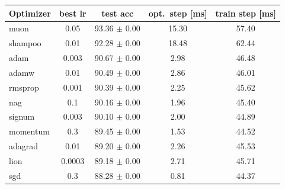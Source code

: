 \begin{tabular}{lcccc}
\toprule
Optimizer & best lr & test acc & opt.\ step [ms] & train step [ms] \\
\midrule
muon & 0.05 & 93.36 $\pm$ 0.00 & 15.30 & 57.40 \\
shampoo & 0.01 & 92.28 $\pm$ 0.00 & 18.48 & 62.44 \\
adam & 0.003 & 90.67 $\pm$ 0.00 & 2.98 & 46.48 \\
adamw & 0.01 & 90.49 $\pm$ 0.00 & 2.86 & 46.01 \\
rmsprop & 0.001 & 90.39 $\pm$ 0.00 & 2.25 & 45.62 \\
nag & 0.1 & 90.16 $\pm$ 0.00 & 1.96 & 45.40 \\
signum & 0.003 & 90.10 $\pm$ 0.00 & 2.00 & 44.89 \\
momentum & 0.3 & 89.45 $\pm$ 0.00 & 1.53 & 44.52 \\
adagrad & 0.01 & 89.20 $\pm$ 0.00 & 2.26 & 45.53 \\
lion & 0.0003 & 89.18 $\pm$ 0.00 & 2.71 & 45.71 \\
sgd & 0.3 & 88.28 $\pm$ 0.00 & 0.81 & 44.37 \\
\bottomrule
\end{tabular}
